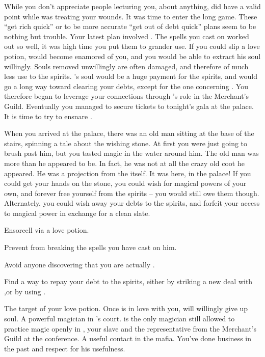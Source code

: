 \documentclass[char]{NeptuneBall}
\begin{document}
While you don't appreciate people lecturing you, about anything, \cManta{} did have a valid point while \cManta{\they} was treating your wounds. It was time to enter the long game. These ``get rich quick'' or to be more accurate ``get out of debt quick'' plans seem to be nothing but trouble. Your latest plan involved \cKing{\King} \cKing{}. The spells you cast on \cSlave{} worked out so well, it was high time you put them to grander use. If you could slip \cKing{} a love potion, \cKing{} would become enamored of you, and you would be able to extract his soul willingly. Souls removed unwillingly are often damaged, and therefore of much less use to the spirits. \cKing{}'s soul would be a huge payment for the spirits, and would go a long way toward clearing your debts, except for the one concerning \cAriel{}. You therefore began to leverage your connections through \cSlave{}'s role in the Merchant's Guild. Eventually you managed to secure tickets to tonight's gala at the palace. It is time to try to ensnare \cKing{}.

When you arrived at the palace, there was an old man sitting at the base of the stairs, spinning a tale about the wishing stone. At first you were just going to brush past him, but you tasted magic in the water around him. The old man was more than he appeared to be. In fact, he was not at all the crazy old coot he appeared. He was a projection from the \iWishingStone{} itself. It was here, in the palace! If you could get your hands on the stone, you could wish for magical powers of your own, and forever free yourself from the spirits -- you would still owe them though. Alternately, you could wish away your debts to the spirits, and 
forfeit your access to magical power in exchange for a clean slate.

\begin{itemz}[Goals]
  \item Ensorcell \cKing{\King} \cKing{} via a love potion.
  \item Prevent \cSlave{} from breaking the spells you have cast on him.
  \item Avoid anyone discovering that you are actually \cWitch{}.
  \item Find a way to repay your debt to the spirits, either by striking a new deal with \cAriel{},or by using \iWishingStone{}.
\end{itemz}

\begin{contacts}
  \contact{\cKing{}} The target of your love potion. Once \cKing{\they} is in love with you, \cKing{\they} will willingly give up \cKing{\them} soul.
  \contact{\cManta{}} A powerful magician in \cKing{}'s court. \cManta{\They} is the only magician still allowed to practice magic openly in \pAtlantis{}
  \contact{\cSlave{\MYname}} \cSlave{}, your slave and the representative from the Merchant's Guild at the conference.
  \contact{\cPriest{}} A useful contact in the mafia. You've done business in the past and respect \cPriest{\them} for his usefulness.
\end{contacts}
\end{document}
